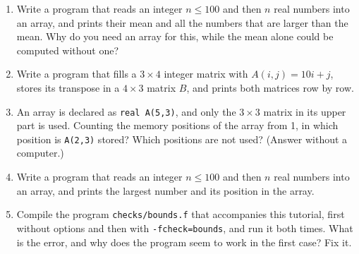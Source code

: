 \begin{enumerate}
    \item Write a program that reads an integer $n \le 100$ and then $n$ real numbers into an array, and prints their mean and all the numbers that are larger than the mean. Why do you need an array for this, while the mean alone could be computed without one?
    \item Write a program that fills a $3 \times 4$ integer matrix with $A(i,j) = 10i + j$, stores its transpose in a $4 \times 3$ matrix $B$, and prints both matrices row by row.
    \item An array is declared as \texttt{real A(5,3)}, and only the $3 \times 3$ matrix in its upper part is used. Counting the memory positions of the array from 1, in which position is \texttt{A(2,3)} stored? Which positions are not used? (Answer without a computer.)
    \item Write a program that reads an integer $n \le 100$ and then $n$ real numbers into an array, and prints the largest number and its position in the array.
    \item Compile the program \texttt{checks/bounds.f} that accompanies this tutorial, first without options and then with \texttt{-fcheck=bounds}, and run it both times. What is the error, and why does the program seem to work in the first case? Fix it.
\end{enumerate}
